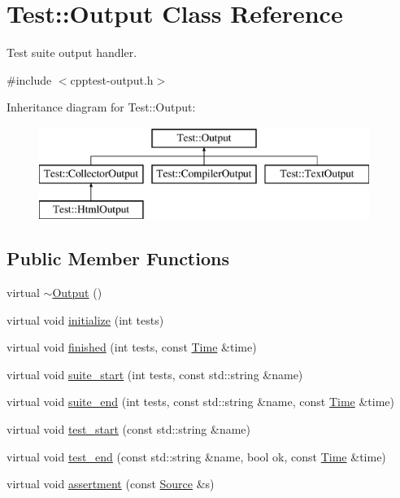 \hypertarget{class_test_1_1_output}{}\section{Test\+:\+:Output Class Reference}
\label{class_test_1_1_output}


Test suite output handler.  




{\ttfamily \#include $<$cpptest-\/output.\+h$>$}

Inheritance diagram for Test\+:\+:Output\+:\begin{figure}[H]
\begin{center}
\leavevmode
\includegraphics[height=3.000000cm]{class_test_1_1_output}
\end{center}
\end{figure}
\subsection*{Public Member Functions}
\begin{DoxyCompactItemize}
\item 
virtual \mbox{\hyperlink{class_test_1_1_output_a838de994609ac3d13b7d7cd389f56090}{$\sim$\+Output}} ()
\item 
virtual void \mbox{\hyperlink{class_test_1_1_output_aa66480875d088befc6c23ecfd1107cc1}{initialize}} (int tests)
\item 
virtual void \mbox{\hyperlink{class_test_1_1_output_aeff8af8326a8c54a38199f76837f860a}{finished}} (int tests, const \mbox{\hyperlink{class_test_1_1_time}{Time}} \&time)
\item 
virtual void \mbox{\hyperlink{class_test_1_1_output_a7022c32c5a1577b10b93d3942746f17d}{suite\+\_\+start}} (int tests, const std\+::string \&name)
\item 
virtual void \mbox{\hyperlink{class_test_1_1_output_a6dbf4c0adb2bd4a7364c629179f788a6}{suite\+\_\+end}} (int tests, const std\+::string \&name, const \mbox{\hyperlink{class_test_1_1_time}{Time}} \&time)
\item 
virtual void \mbox{\hyperlink{class_test_1_1_output_a52d43b97609febc5abbc6da9aa0abac2}{test\+\_\+start}} (const std\+::string \&name)
\item 
virtual void \mbox{\hyperlink{class_test_1_1_output_a3796943e3b56373492c957212a21454e}{test\+\_\+end}} (const std\+::string \&name, bool ok, const \mbox{\hyperlink{class_test_1_1_time}{Time}} \&time)
\item 
virtual void \mbox{\hyperlink{class_test_1_1_output_a48c31f0baa7627d81939be840c9a7f65}{assertment}} (const \mbox{\hyperlink{class_test_1_1_source}{Source}} \&s)
\end{DoxyCompactItemize}
